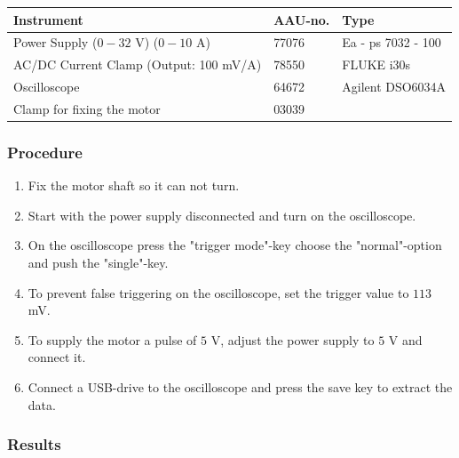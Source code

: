 \begin{table}[H]
\begin{tabular}{|l|l|p{4cm}|}
\hline%
  \textbf{Instrument}                    &  \textbf{AAU-no.}  &  \textbf{Type}       \\
\hline%
  Power Supply ($0 - 32$ V) ($0 - 10$ A) &  77076             &  Ea - ps 7032 - 100  \\
\hline%
  AC/DC Current Clamp (Output: 100 mV/A) &  78550             &  FLUKE i30s          \\
\hline%
  Oscilloscope                           &  64672             &  Agilent DSO6034A    \\
\hline%
  Clamp for fixing the motor             &  03039             &                      \\
\hline%
\end{tabular}
\end{table}

\subsubsection{Procedure}

\begin{enumerate}
  \item Fix the motor shaft so it can not turn.
  \item Start with the power supply disconnected and turn on the oscilloscope.
  \item On the oscilloscope press the "trigger mode"-key choose the "normal"-option and push the "single"-key.
  \item To prevent false triggering on the oscilloscope, set the trigger value to $113$ mV.
  \item To supply the motor a pulse of $5$ V, adjust the power supply to $5$ V and connect it.
  \item Connect a USB-drive to the oscilloscope and press the save key to extract the data.
\end{enumerate}

\subsubsection{Results}

